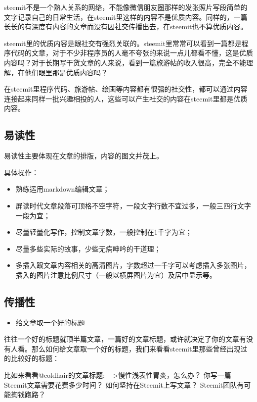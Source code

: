 \documentclass[]{ctexbook}
\providecommand{\tightlist}{%
  \setlength{\itemsep}{0pt}\setlength{\parskip}{0pt}}
\begin{document}
steemit不是一个熟人关系的网络，不能像微信朋友圈那样的发张照片写段简单的文字记录自己的日常生活，在steemit里这样的内容不是优质内容。同样的，一篇长长的有深度有内容的文章而没有因社交传播出去，在steemit也不算优质内容。

steemit里的优质内容是跟社交有强烈关联的。steemit里常常可以看到一篇都是程序代码的文章，对于不少非程序员的人毫不夸张的来说一点儿都看不懂，这是优质内容吗？对于长期写干货文章的人来说，看到一篇旅游帖的收入很高，完全不能理解，在他们眼里那是优质内容吗？

在steemit里程序代码、旅游帖、绘画等内容都有很强的社交性，都可以通过内容连接起来同样一批兴趣相投的人，这些可以产生社交的内容在steemit里都是优质内容。

\subsection{易读性}

易读性主要体现在文章的排版，内容的图文并茂上。

具体操作：

\begin{itemize}
\tightlist
\item
  熟练运用markdown编辑文章；
\item
  屏读时代文章段落可顶格不空字符，一段文字行数不宜过多，一般三四行文字一段为宜；
\item
  尽量轻量化写作，控制文章字数，一般控制在1千字为宜；
\item
  尽量多些实际的故事，少些无病呻吟的干道理；
\item
  多插入跟文章内容相关的高清图片，字数超过一千字可以考虑插入多张图片，插入的图片注意比例尺寸（一般以横屏图片为宜）及居中显示等。
\end{itemize}

\subsection{传播性}

\begin{itemize}
\tightlist
\item
  给文章取一个好的标题
\end{itemize}

往往一个好的标题就顶半篇文章，一篇好的文章标题，或许就决定了你的文章有没有人看。那么如何给文章取一个好的标题，我们来看看steemit里那些曾经出现过的比较好的标题：

比如来看看@coldhair的文章标题:
~
\textgreater{}慢性浅表性胃炎，怎么办？
你写一篇Steemit文章需要花费多少时间？
如何坚持在Steemit上写文章？
Steemit团队有可能掏钱跑路？
\end{document}
